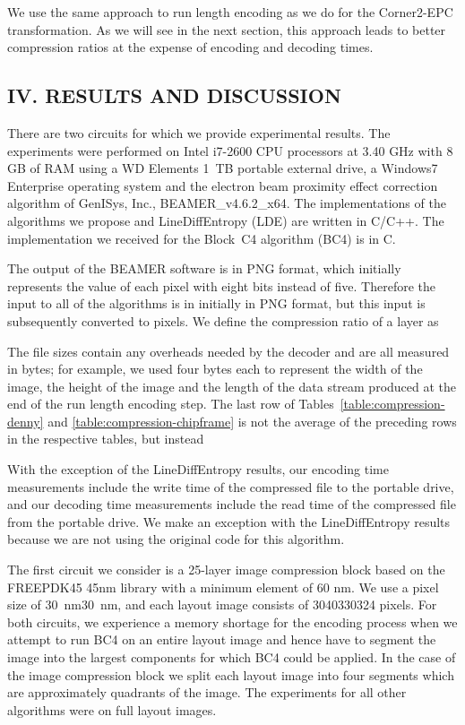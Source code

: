 \documentclass{article}
\begin{document}
We use the same approach to run length encoding as we do for the Corner2-EPC
transformation.  As we will see in the next section, this approach leads to
better compression ratios at the expense of encoding and decoding times.

\subsection*{IV. RESULTS AND DISCUSSION}
There are two circuits for which we provide experimental results.
The experiments were performed on Intel i7-2600 CPU 
processors at 3.40 GHz with 8 GB of RAM using a WD Elements 1~TB portable
external drive, a Windows7 Enterprise operating
system and the electron beam proximity effect correction algorithm of 
GenISys, Inc., {\small BEAMER}\_v4.6.2\_x64.  
The implementations of the algorithms we propose and LineDiffEntropy (LDE)
are written in C/C++.  The implementation we received for the Block~C4
algorithm (BC4) is in C.

The output of the {\small BEAMER} software is in PNG format, which
initially represents the value of each pixel with eight bits instead of five.
Therefore the input to all of the algorithms is in initially in 
PNG format, but this input is subsequently converted to pixels.
We define the compression ratio of a layer as
  
The file sizes contain any overheads needed by the decoder and are all
measured in bytes; for example,
we used four bytes each to represent the width of the image, the height of the
image and the length of the data stream produced at the end of the
run length encoding step.
The last row of Tables~\ref{table:compression-denny} 
and \ref{table:compression-chipframe} 
is not the average of the preceding rows in the respective tables, but instead

With the exception of the LineDiffEntropy results, our encoding time 
measurements include the write time of the compressed file to the portable drive,
and our decoding time measurements include the read time of the compressed file
from 
the portable drive.  We make an exception with the LineDiffEntropy results
because we are not using the original code for this algorithm.

The first circuit we consider is a 25-layer image compression block based on 
the FREEPDK45 45nm library with a minimum element of 60 nm.  
We use a pixel size of 30~nm30~nm, and each layout image consists of
3040330324 pixels.
For both circuits, we experience a memory shortage for the encoding 
process when we attempt to run BC4 on an entire layout
image and hence have to segment the image into the largest components for 
which BC4 could be applied. 
In the case  of the image compression block
we split each layout image into four segments which are 
approximately quadrants of the image.
The experiments for all other algorithms were on full layout images.  
\end{document}
